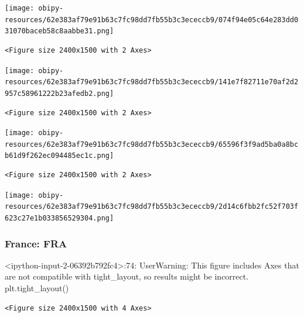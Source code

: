 \documentclass[11pt]{article}
\begin{document}
\begin{enumerate}
\begin{center}
\texttt{[image: obipy-resources/62e383af79e91b63c7fc98dd7fb55b3c3ececcb9/074f94e05c64e283dd031070baceb58c8aabbe31.png]}
\end{center}

\begin{verbatim}
<Figure size 2400x1500 with 2 Axes>
\end{verbatim}


\begin{center}
\texttt{[image: obipy-resources/62e383af79e91b63c7fc98dd7fb55b3c3ececcb9/141e7f82711e70af2d2957c58961222b23afedb2.png]}
\end{center}

\begin{verbatim}
<Figure size 2400x1500 with 2 Axes>
\end{verbatim}


\begin{center}
\texttt{[image: obipy-resources/62e383af79e91b63c7fc98dd7fb55b3c3ececcb9/65596f3f9ad5ba0a8bcb61d9f262ec094485ec1c.png]}
\end{center}

\begin{verbatim}
<Figure size 2400x1500 with 2 Axes>
\end{verbatim}


\begin{center}
\texttt{[image: obipy-resources/62e383af79e91b63c7fc98dd7fb55b3c3ececcb9/2d14c6fbb2fc52f703f623c27e1b033856529304.png]}
\end{center}
\end{enumerate}




\subsubsection{France: FRA}
\label{sec:orga1c2540}

<ipython-input-2-06392b792fc4>:74: UserWarning: This figure includes Axes that are not compatible with tight\_layout, so results might be incorrect.
  plt.tight\_layout()

\begin{verbatim}
<Figure size 2400x1500 with 4 Axes>
\end{verbatim}
\end{document}
